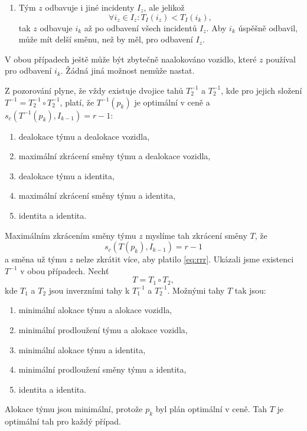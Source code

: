 \begin{dukaz}
\begin{enumerate}
    \item
      Tým $z$ odbavuje i jiné incidenty $I_z$, ale jelikož
      \begin{equation*}
        \forall i_z \in I_z \colon T_I(i_z) < T_I(i_k),
      \end{equation*}
      tak $z$ odbavuje $i_k$ až po odbavení všech incidentů $I_z$.
      Aby $i_k$ úspěšně odbavil, může mít delší směnu, než by měl, pro odbavení $I_z$.
  \end{enumerate}
  V obou případech ještě může být zbytečně naalokováno vozidlo, které $z$ používal pro odbavení $i_k$.
  Žádná jiná možnost nemůže nastat.

  Z pozorování plyne, že vždy existuje dvojice tahů $T_2^{-1}$ a $T_2^{-1}$, kde pro jejich složení $T^{-1} = T_2^{-1} \circ T_2^{-1}$,
  platí, že $T^{-1}(p_k)$ je optimální v ceně a $s_c(T^{-1}(p_k), I_{k-1}) = r - 1$:
  \begin{enumerate}
  \item
    dealokace týmu a dealokace vozidla, 
  \item
    maximální zkrácení směny týmu a dealokace vozidla,
  \item
    dealokace týmu a identita,
  \item
    maximální zkrácení směny týmu a identita,
  \item
    identita a identita.
  \end{enumerate}
  Maximálním zkrácením směny týmu $z$ myslíme tah zkrácení směny $T$, že
  \begin{equation}\label{eq:rrr}
    s_c(T(p_k), I_{k-1}) = r - 1
  \end{equation}
  a směna už týmu $z$ nelze zkrátit více, aby platilo \ref{eq:rrr}.
  Ukázali jsme existenci $T^{-1}$ v obou případech. Nechť
  \begin{equation*}
    T = T_1 \circ T_2,
  \end{equation*}
  kde $T_1$ a $T_2$ jsou inverzními tahy k $T_1^{-1}$ a $T_2^{-1}$.
  Možnými tahy $T$ tak jsou:
  \begin{enumerate}
  \item
    minimální alokace týmu a alokace vozidla, 
  \item
    minimální prodloužení týmu a alokace vozidla,
  \item
    minimální alokace týmu a identita,
  \item
    minimální prodloužení směny týmu a identita,
  \item
    identita a identita.
  \end{enumerate}

  Alokace týmu jsou minimální, protože $p_k$ byl plán optimální v ceně.
  Tah $T$ je optimální tah pro každý případ.
\end{dukaz}

